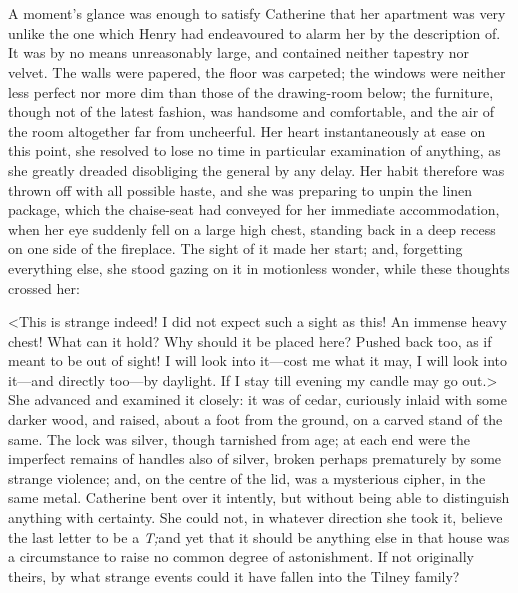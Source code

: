 \chapter[Chapter \thechapter]{}
	
\lettrine{A}{} moment's glance was enough to satisfy Catherine that her apartment was very unlike the one which Henry had endeavoured to alarm her by the description of. It was by no means unreasonably large, and contained neither tapestry nor velvet. The walls were papered, the floor was carpeted; the windows were neither less perfect nor more dim than those of the drawing-room below; the furniture, though not of the latest fashion, was handsome and comfortable, and the air of the room altogether far from uncheerful. Her heart instantaneously at ease on this point, she resolved to lose no time in particular examination of anything, as she greatly dreaded disobliging the general by any delay. Her habit therefore was thrown off with all possible haste, and she was preparing to unpin the linen package, which the chaise-seat had conveyed for her immediate accommodation, when her eye suddenly fell on a large high chest, standing back in a deep recess on one side of the fireplace. The sight of it made her start; and, forgetting everything else, she stood gazing on it in motionless wonder, while these thoughts crossed her: 

 <This is strange indeed! I did not expect such a sight as this! An immense heavy chest! What can it hold? Why should it be placed here? Pushed back too, as if meant to be out of sight! I will look into it—cost me what it may, I will look into it—and directly too—by daylight. If I stay till evening my candle may go out.> She advanced and examined it closely: it was of cedar, curiously inlaid with some darker wood, and raised, about a foot from the ground, on a carved stand of the same. The lock was silver, though tarnished from age; at each end were the imperfect remains of handles also of silver, broken perhaps prematurely by some strange violence; and, on the centre of the lid, was a mysterious cipher, in the same metal. Catherine bent over it intently, but without being able to distinguish anything with certainty. She could not, in whatever direction she took it, believe the last letter to be a \textit{T;}and yet that it should be anything else in that house was a circumstance to raise no common degree of astonishment. If not originally theirs, by what strange events could it have fallen into the Tilney family? 

